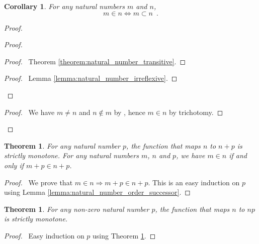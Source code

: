 \documentclass{report}
\let\qed\relax
\newtheorem{theorem}[axiom]{Theorem}
\newtheorem{corollary}{Corollary}[axiom]
\theoremstyle{definition}
\begin{document}
    \begin{corollary}
        For any natural numbers $m$ and $n$,
        \[ m \in n \Leftrightarrow m \subset n \enspace . \]
    \end{corollary}

    \begin{proof}
        \pf
        \begin{proof}
            \begin{proof}
                \pf\ Theorem \ref{theorem:natural_number_transitive}.
            \end{proof}
            \begin{proof}
                \pf\ Lemma \ref{lemma:natural_number_irreflexive}.
            \end{proof}
        \end{proof}
        \begin{proof}
            \pf\ We have $m \neq n$ and $n \notin m$ by , hence $m \in n$ by trichotomy.
        \end{proof}
        \qed
    \end{proof}

    \begin{theorem}
        \label{theorem:addition_strictly_monotone}
        For any natural number $p$, the function that maps $n$ to $n + p$ is strictly monotone.
        For any natural numbers $m$, $n$ and $p$, we have $m \in n$ if and only if $m + p \in n + p$.
    \end{theorem}

    \begin{proof}
        \pf\ We prove that $m \in n \Rightarrow m + p \in n + p$. This is an easy induction on $p$ using
        Lemma \ref{lemma:natural_number_order_successor}. \qed
    \end{proof}

    \begin{theorem}
        For any non-zero natural number $p$, the function that maps $n$ to $np$ is strictly monotone.
    \end{theorem}

    \begin{proof}
        \pf\ Easy induction on $p$ using Theorem \ref{theorem:addition_strictly_monotone}. \qed
    \end{proof}
\end{document}
